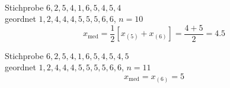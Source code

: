\begin{bsp}[Würfeln]
     \\
    \begin{mytable}
        \begin{minipage}{0.48\textwidth}
            \centering
            Stichprobe $6,2,5,4,1,6,5,4,5,4$\\
            geordnet $1,2,4,4,4,5,5,5,6,6$, $n=10$
            \[
                x_{\mathrm{med}} = \frac12\left[x_{(5)}+x_{(6)}\right] = \frac{4+5}{2} = 4.5
            \]
        \end{minipage}
        \hfill
        \begin{minipage}{0.48\textwidth}
            \centering
            Stichprobe $6,2,5,4,1,6,5,4,5,4,5$\\
            geordnet $1,2,4,4,4,5,5,5,5,6,6$, $n=11$
            \[
                x_{\mathrm{med}} = x_{(6)} = 5
            \]
        \end{minipage}
    \end{mytable}
\end{bsp}

